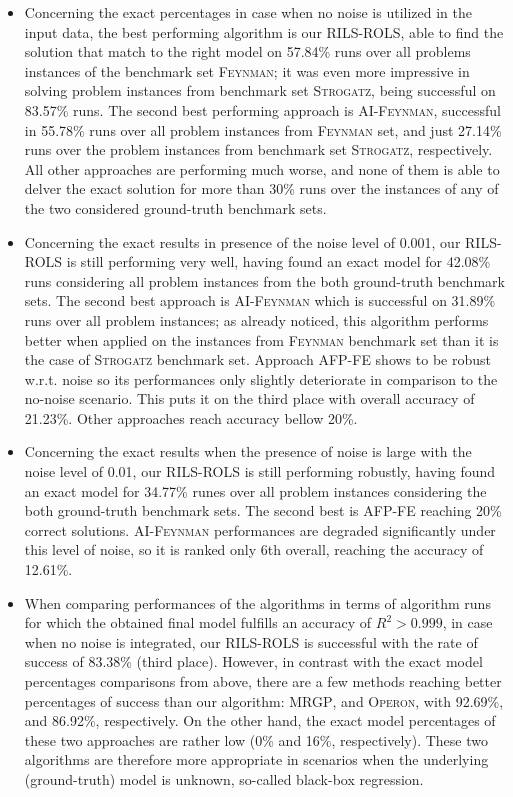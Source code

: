 \documentclass[a4paper,12pt]{elsarticle}
\begin{document}
\begin{itemize}
	\item Concerning the exact percentages in case when no noise is utilized in the input data, the best performing algorithm is our \textsc{RILS-ROLS}, able to find the solution that match to the right model on 57.84\% runs over all problems instances of the benchmark set \textsc{Feynman}; it was even more impressive in solving problem instances from benchmark set \textsc{Strogatz}, being successful on 83.57\% runs. The second best performing  approach is \textsc{AI-Feynman}, successful in 55.78\%   runs over all problem instances from \textsc{Feynman} set, and just 27.14\% runs over the problem instances from benchmark set   \textsc{Strogatz}, respectively. All other approaches are performing much worse, and none of them is able to delver the exact solution for more than 30\% runs over the instances of any of the two considered ground-truth benchmark sets. 
	\item   Concerning the exact results in presence of the   noise  level of 0.001, our \textsc{RILS-ROLS} is still performing very well, having found an exact model for 42.08\% runs considering all problem instances from the both ground-truth benchmark sets. The second best approach is \textsc{AI-Feynman} which is successful on 31.89\% runs over all problem instances; as  already noticed, this algorithm performs better when applied on the instances from \textsc{Feynman} benchmark set than it is the case of \textsc{Strogatz} benchmark set. Approach  \textsc{AFP-FE} shows to be robust w.r.t. noise so its performances only slightly deteriorate in comparison to the no-noise scenario. This puts it on the third place with overall accuracy of 21.23\%. Other approaches reach   accuracy bellow 20\%. 
	\item  Concerning the exact results when the presence of noise is large with  the noise level of 0.01,  our \textsc{RILS-ROLS} is still performing robustly, having found an exact model for  34.77\% runes over all problem instances considering the both ground-truth benchmark sets. The second best is   \textsc{AFP-FE} reaching 20\% correct solutions. \textsc{AI-Feynman} performances are degraded significantly under this level of noise, so it is ranked only 6th overall, reaching the accuracy of 12.61\%.    
	
	\item When comparing performances of the algorithms in terms of algorithm runs for which the obtained final model fulfills an accuracy of $R^2 > 0.999$, in case when no noise is integrated, our \textsc{RILS}-\textsc{ROLS} is successful with the rate of success of 83.38\% (third place). However, in contrast with the exact model percentages comparisons from above, there are a few methods reaching   better percentages of success than our algorithm: \textsc{MRGP}, and \textsc{Operon}, with 92.69\%, and 86.92\%, respectively. On the other hand, the exact model percentages of these two approaches are rather low (0\% and 16\%, respectively). These two algorithms are therefore more appropriate in scenarios when the underlying (ground-truth) model is unknown, so-called black-box regression. 
	

\end{itemize}
\end{document}
